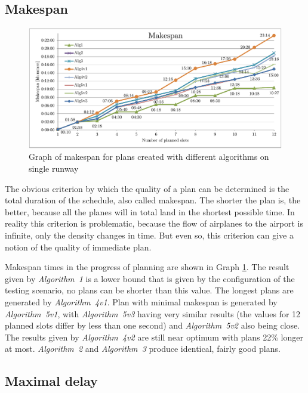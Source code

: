 \subsection{Makespan}

\begin{figure}[h]
    \centering
    \includegraphics[width=\textwidth]{graphs/1rwy-alternating-makespan.pdf}
    \caption{Graph of makespan for plans created with different algorithms on single runway}
    \label{graph:1rwy-alternating-makespan}
\end{figure}

The obvious criterion by which the quality of a plan can be determined is the total duration of the schedule, also called makespan. The shorter the plan is, the better, because all the planes will in total land in the shortest possible time. In reality this criterion is problematic, because the flow of airplanes to the airport is infinite, only the density changes in time. But even so, this criterion can give a notion of the quality of immediate plan.

Makespan times in the progress of planning are shown in Graph \ref{graph:1rwy-alternating-makespan}. The result given by {\em Algorithm~1} is a lower bound that is given by the configuration of the testing scenario, no plans can be shorter than this value. The longest plans are generated by {\em Algorithm~4v1}. Plan with minimal makespan is generated by {\em Algorithm~5v1}, with {\em Algorithm~5v3} having very similar results (the values for 12 planned slots differ by less than one second) and {\em Algorithm~5v2} also being close. The results given by {\em Algorithm~4v2} are still near optimum with plans 22\% longer at most. {\em Algorithm~2} and {\em Algorithm~3} produce identical, fairly good plans.

\subsection{Maximal delay}

